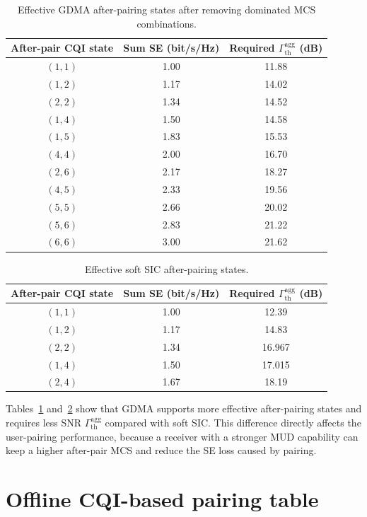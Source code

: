 \begin{table}[t]
\centering
\small
\caption{Effective GDMA after-pairing states after removing dominated MCS combinations.}
\label{tab:gdma-states}
\begin{tabular}{@{}ccc@{}}
\toprule
After-pair CQI state & Sum SE (bit/s/Hz) & Required $\Gamma^{\mathrm{agg}}_{\mathrm{th}}$ (dB) \\
\midrule
$(1,1)$ & 1.00 & 11.88 \\
$(1,2)$ & 1.17 & 14.02 \\
$(2,2)$ & 1.34 & 14.52 \\
$(1,4)$ & 1.50 & 14.58 \\
$(1,5)$ & 1.83 & 15.53 \\
$(4,4)$ & 2.00 & 16.70 \\
$(2,6)$ & 2.17 & 18.27 \\
$(4,5)$ & 2.33 & 19.56 \\
$(5,5)$ & 2.66 & 20.02 \\
$(5,6)$ & 2.83 & 21.22 \\
$(6,6)$ & 3.00 & 21.62 \\
\bottomrule
\end{tabular}
\end{table}

\begin{table}[t]
\centering
\small
\caption{Effective soft SIC after-pairing states.}
\label{tab:sic-states}
\begin{tabular}{@{}ccc@{}}
\toprule
After-pair CQI state & Sum SE (bit/s/Hz) & Required $\Gamma^{\mathrm{agg}}_{\mathrm{th}}$ (dB) \\
\midrule
$(1,1)$ & 1.00 & 12.39 \\
$(1,2)$ & 1.17 & 14.83 \\
$(2,2)$ & 1.34 & 16.967 \\
$(1,4)$ & 1.50 & 17.015 \\
$(2,4)$ & 1.67 & 18.19 \\
\bottomrule
\end{tabular}
\end{table}

Tables~\ref{tab:gdma-states} and~\ref{tab:sic-states} show that GDMA supports more effective after-pairing states and requires less SNR $\Gamma^{\mathrm{agg}}_{\mathrm{th}}$ compared with soft SIC. 
This difference directly affects the user-pairing performance, because a receiver with a stronger MUD capability can keep a higher after-pair MCS and reduce the SE loss caused by pairing.

\section{Offline CQI-based pairing table}
\label{sec:offline-pairing-table}

